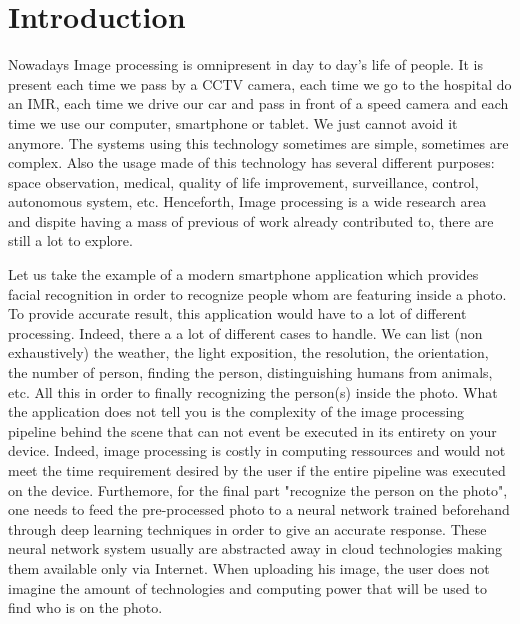 \chapter*{Introduction}
\label{introduction.chap.introduction}

Nowadays Image processing is omnipresent in day to day's life of people. It is present each time we pass by a CCTV
camera, each time we go to the hospital do an IMR, each time we drive our car and pass in front of a speed camera and
each time we use our computer, smartphone or tablet. We just cannot avoid it anymore. The systems using this technology
sometimes are simple, sometimes are complex. Also the usage made of this technology has several different purposes:
space observation, medical, quality of life improvement, surveillance, control, autonomous system, etc. Henceforth,
Image processing is a wide research area and dispite having a mass of previous of work already contributed to, there are
still a lot to explore.

Let us take the example of a modern smartphone application which provides facial recognition in order to recognize
people whom are featuring inside a photo. To provide accurate result, this application would have to a lot of different
processing. Indeed, there a a lot of different cases to handle. We can list (non exhaustively) the weather, the light
exposition, the resolution, the orientation, the number of person, finding the person, distinguishing humans from
animals, etc. All this in order to finally recognizing the person(s) inside the photo. What the application does not
tell you is the complexity of the image processing pipeline behind the scene that can not event be executed in its
entirety on your device. Indeed, image processing is costly in computing ressources and would not meet the time
requirement desired by the user if the entire pipeline was executed on the device. Furthemore, for the final part
"recognize the person on the photo", one needs to feed the pre-processed photo to a neural network trained beforehand
through deep learning techniques in order to give an accurate response. These neural network system usually are
abstracted away in cloud technologies making them available only via Internet. When uploading his image, the user does
not imagine the amount of technologies and computing power that will be used to find who is on the photo.

